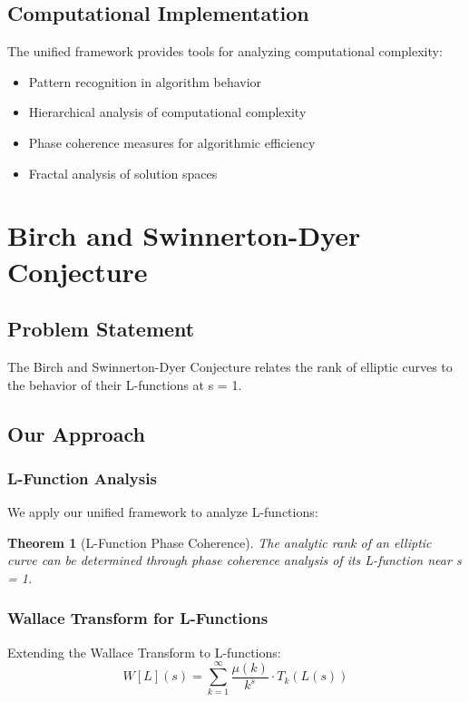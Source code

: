 \documentclass[12pt]{article}
\newtheorem{theorem}{Theorem}
\begin{document}
\subsection{Computational Implementation}

The unified framework provides tools for analyzing computational complexity:
\begin{itemize}
    \item Pattern recognition in algorithm behavior
    \item Hierarchical analysis of computational complexity
    \item Phase coherence measures for algorithmic efficiency
    \item Fractal analysis of solution spaces
\end{itemize}

\section{Birch and Swinnerton-Dyer Conjecture}

\subsection{Problem Statement}
The Birch and Swinnerton-Dyer Conjecture relates the rank of elliptic curves to the behavior of their L-functions at s = 1.

\subsection{Our Approach}

\subsubsection{L-Function Analysis}

We apply our unified framework to analyze L-functions:

\begin{theorem}[L-Function Phase Coherence]
The analytic rank of an elliptic curve can be determined through phase coherence analysis of its L-function near s = 1.
\end{theorem}

\subsubsection{Wallace Transform for L-Functions}

Extending the Wallace Transform to L-functions:
\begin{equation}
W[L](s) = \sum_{k=1}^{\infty} \frac{\mu(k)}{k^s} \cdot T_k(L(s))
\end{equation}
\end{document}
